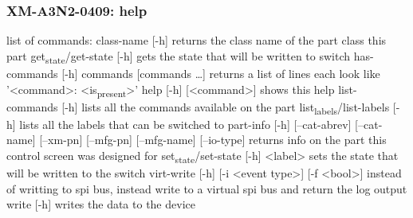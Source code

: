 \documentclass[11pt]{article}
\begin{document}
\subsubsection{XM-A3N2-0409: help}
\label{sec:org8bc144b}
list of commands:
  class-name [-h]
    returns the class name of the part class this part
  get\textsubscript{state}/get-state [-h]
    gets the state that will be written to switch
  has-commands [-h] commands [commands \ldots{}]
    returns a list of lines each look like '<command>: <is\textsubscript{present}>'
  help [-h] [<command>]
    shows this help
  list-commands [-h]
    lists all the commands available on the part
  list\textsubscript{labels}/list-labels [-h]
    lists all the labels that can be switched to
  part-info  [-h] [--cat-abrev] [--cat-name] [--xm-pn] [--mfg-pn] [--mfg-name]
          [--io-type]
    returns info on the part this control screen was designed for
  set\textsubscript{state}/set-state [-h] <label>
    sets the state that will be written to the switch
  virt-write [-h] [-i <event type>] [-f <bool>]
    instead of writting to spi bus, instead write to a virtual spi bus
    and return the log output
  write [-h]
    writes the data to the device
\end{document}
